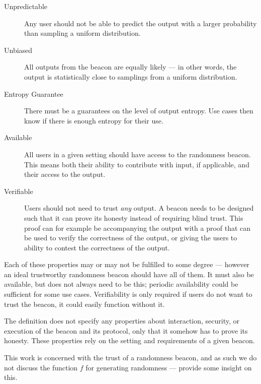 \begin{description}
    \item[Unpredictable]
        Any user should not be able to predict the output with a larger probability than sampling a uniform distribution. 
    \item[Unbiased]
        All outputs from the beacon are equally likely --- in other words, the output is statistically close to samplings from a uniform distribution. 
    \item[Entropy Guarantee]
        There must be a guarantees on the level of output entropy.
Use cases then know if there is enough entropy for their use.
    \item[Available]
        All users in a given setting should have access to the randomness beacon.
        This means both their ability to contribute with input, if applicable, and their access to the output.
    \item[Verifiable]
        Users should not need to trust \emph{any} output.
        A beacon needs to be designed such that it can prove its honesty instead of requiring blind trust.
        This proof can for example be accompanying the output with a proof that can be used to verify the correctness of the output, or giving the users to ability to contest the correctness of the output.
\end{description}

Each of these properties may or may not be fulfilled to some degree --- however an ideal trustworthy randomness beacon should have all of them.%
It must also be available, but does not always need to be this; periodic availability could be sufficient for some use cases.
Verifiability is only required if users do not want to trust the beacon, it could easily function without it.


The definition does not specify any properties about interaction, security, or execution of the beacon and its protocol, only that it somehow has to prove its honesty.
These properties rely on the setting and requirements of a given beacon.

This work is concerned with the trust of a randomness beacon, and as such we do not discuss the function $f$ for generating  randomness --- \citet{bonneau2015bitcoin} provide some insight on this.
